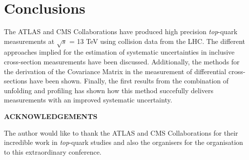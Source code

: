 \documentclass[12pt]{article}
\def\Acknowledgements{\bigskip  \bigskip \begin{center} \begin{large}
             \bf ACKNOWLEDGEMENTS \end{large}\end{center}}
\begin{document}
\section{Conclusions}
The ATLAS and CMS Collaborations have produced high precision \emph{top}-quark measurements at $\sqrt{s}$ = 13 TeV using collision data from the LHC. The different approaches implied for the estimation of systematic uncertainties in inclusive cross-section measurements have been discussed. Additionally, the methods for the derivation of the Covariance Matrix in the measurement of differential cross-sections have been shown. Finally, the first results from the combination of unfolding and profiling has shown how this method succefully delivers measurements with an improved systematic uncertainty.






\Acknowledgements
The author would like to thank the ATLAS and CMS Collaborations for their incredible work in \emph{top}-quark studies and also the organisers for the organisation to this extraordinary conference.
\end{document}
